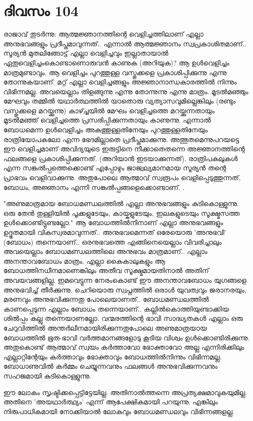 
\section{ദിവസം 104}


രാജാവ്‌ തുടര്‍ന്നു: ആത്മജ്ഞാനത്തിന്റെ വെളിച്ചത്തിലാണ്‌ എല്ലാ അനുഭവങ്ങളും പ്രദീപ്തമാവുന്നത്‌.. എന്നാല്‍ ആത്മജ്ഞാനം സ്വപ്രകാശിതമാണ്‌.. സൂര്യന്‍ മുതലിങ്ങോട്ട്‌ എല്ലാ വെളിച്ചവും ഇല്ലാതായാല്‍ ഏതുവെളിച്ചംകൊണ്ടാണൊരുവന്‍ കാണുക (അറിയുക)? ആ ഉള്‍വെളിച്ചം മാത്രമുണ്ടാവും. ആ വെളിച്ചം പുറത്തുള്ള വസ്തുക്കളെ പ്രകാശിപ്പിക്കുന്നു എന്നു തോന്നുകയാണ്‌. മറ്റ്‌ എല്ലാ വെളിച്ചങ്ങളും അജ്ഞാനാന്ധകാരത്തില്‍ നിന്നും വിഭിന്നമല്ല. അവയെല്ലാം തിളങ്ങുന്നു എന്നു തോന്നുന്നു എന്നു മാത്രം. മൂടല്‍മഞ്ഞും മേഘവും തമ്മില്‍ യഥാര്‍ത്ഥത്തില്‍ യാതൊരു വ്യത്യാസവുമില്ലെങ്കിലും (രണ്ടും വസ്തുക്കളെ മറയ്ക്കുന്നു) കാഴ്ച്ചയില്‍ മേഘം വെളിച്ചത്തെ മറയ്ക്കുന്നതായും മൂടല്‍മഞ്ഞ്‌ വെളിച്ചത്തെ പ്രസരിപ്പിക്കുന്നതായും കാണുന്നു. എന്നാല്‍ ബോധമെന്ന ഉള്‍വെളിച്ചം അകത്തുള്ളതിനേയും പുറത്തുള്ളതിനേയും രാത്രിയോപകലോ എന്ന ഭേദമില്ലാതെ പ്രദീപ്തമാക്കുന്നു. അത്ഭുതമെന്നുപറയട്ടെ ഈ വെളിച്ചമാണ്‌ അവിദ്യയുടെ ഇരുട്ടിനെ നീക്കാതെതന്നെ അജ്ഞാനത്തിന്റെ ഫലങ്ങളെ പ്രകാശിപ്പിക്കുന്നത്‌. (അറിയാന്‍ ഇടയാക്കുന്നത്‌). രാത്രിപകലുകള്‍ എന്ന സങ്കല്‍പ്പത്തെക്കൊണ്ട്‌ എപ്പോഴും ജാജ്വല്യമാനമായ സൂര്യന്‍ തന്റെ പ്രാഭവം വെളിവാക്കുന്നു. അതുപോലെ ആത്മാവ്‌ സ്വരൂപം വെളിപ്പെടുത്തുന്നത്‌, ബോധം, അജ്ഞാനം എന്നി സങ്കല്‍പ്പങ്ങളെക്കൊണ്ടാണ്‌. .

"അണുമാത്രമായ ബോധമണ്ഡലത്തില്‍ എല്ലാ അനുഭവങ്ങളും കുടികൊള്ളുന്നു. ഒരു തേന്‍ തുള്ളിയില്‍ പൂക്കളുടേയും, കായ്കളുടേയും, ഇലകളുടെയും സൂക്ഷ്മസത്ത ഉള്‍ക്കൊണ്ടിട്ടുണ്ടല്ലോ." ആ ബോധത്തില്‍നിനാണ്‌ എല്ലാ  അനുഭവങ്ങളും ഉദ്ഭൂതമായി വികസ്വരമാവുന്നത്‌.. അനുഭവമെന്നത്‌ ഒരേയൊരു 'അനുഭവി' (ബോധം) തന്നെയാണ്‌.. ഒരനുഭവത്തെ എങ്ങിനെയെല്ലാം വിവരിച്ചാലും അവയെല്ലാം ബോധമണ്ഡലത്തിലെ അനുഭവം മാത്രമാണ്‌.. എല്ലാം അനന്താവബോധം മാത്രം. എല്ലാ കൈകാലുകളും ആ ബോധത്തിനധീനമാണെങ്കിലും അതീവ സൂക്ഷ്മമായതിനാല്‍ അതിന്‌ അവയവങ്ങളില്ല. ഇമവെട്ടുന്ന നേരംകൊണ്ട്‌ ഈ അനന്താവബോധം യുഗങ്ങളെ അനുഭവിച്ച്‌ തീര്‍ക്കുന്നു. ചെറിയൊരു സ്വപ്നത്തില്‍ ഒരാള്‍ യുവത്വവും ജരാനരയും, മരണവും അനുഭവിക്കുന്നതു പോലെയാണത്‌.. ബോധമണ്ഡലത്തില്‍ കാണപ്പെടുന്ന എല്ലാം ബോധം തന്നെയാണ്‌.. കല്ലില്‍കൊത്തിയുണ്ടാക്കിയ ശില്‍പ്പം കല്ലു തന്നെയാണല്ലോ. വന്മരത്തിന്റെ ഭാവി സാദ്ധ്യതകള്‍ എല്ലാം ഒരു ചേറുവിത്തില്‍ അന്തര്‍ലീനമായിരിക്കുന്നതുപോലെ അണുമാത്രയായ ബോധത്തില്‍ ഭൂത-ഭാവി വര്‍ത്തമാനങ്ങളോടു കൂടിയ വിശ്വം ഉള്‍ക്കൊണ്ടിരിക്കുന്നു. അതുകൊണ്ട്‌ ആത്മാവ്‌ സ്വയം കര്‍ത്താവോ ഭോക്താവോ അല്ല എന്നിരിക്കിലും എല്ലാറ്റിന്റേയും കര്‍ത്താവും ഭോക്താവും ബോധത്തില്‍നിന്നും വിഭിന്നമല്ല. ബോധാണുവില്‍ കര്‍മ്മം ചെയ്യുന്നവനും ഫലങ്ങള്‍ അനുഭവിക്കുന്നവനും സഹജമായി കുടികൊള്ളുന്നു.

ഈ ലോകം സൃഷ്ടിക്കപ്പെട്ടിട്ടേയില്ല. അതിനാല്‍ത്തന്നെ അപ്രത്യക്ഷമാവുകയുമില്ല. അതിനെ 'അയഥാര്‍ത്ഥ്യം' എന്ന് ആപേക്ഷികമായി പറയുന്നു. എങ്കിലും നിരുപാധികമായി നോക്കിയാല്‍ ലോകവും ബോധമണ്ഡലവും വിഭിന്നങ്ങളല്ല. 
